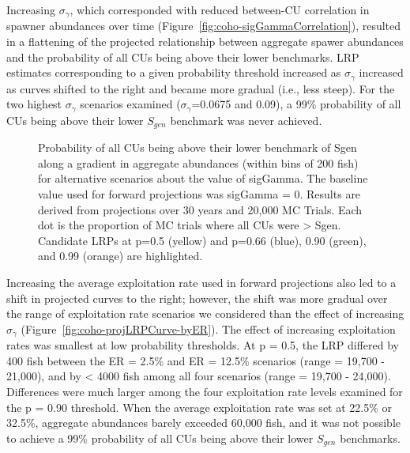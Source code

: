 \documentclass[11pt]{book}
\begin{document}
Increasing \(\sigma_{\gamma}\), which corresponded with reduced between-CU correlation in spawner abundances over time (Figure~\ref{fig:coho-sigGammaCorrelation}), resulted in a flattening of the projected relationship between aggregate spawer abundances and the probability of all CUs being above their lower benchmarks. LRP estimates corresponding to a given probability threshold increased as \(\sigma_{\gamma}\) increased as curves shifted to the right and became more gradual (i.e., less steep). For the two highest \(\sigma_{\gamma}\) scenarios examined (\(\sigma_{\gamma}\)=0.0675 and 0.09), a 99\% probability of all CUs being above their lower \(S_{gen}\) benchmark was never achieved.
\begin{figure}[htb]

{\centering {} 

}

\caption{Probability of all CUs being above their lower benchmark of Sgen along a gradient in aggregate abundances (within bins of 200 fish) for alternative scenarios about the value of sigGamma. The baseline value used for forward projections was sigGamma = 0. Results are derived from projections over 30 years and 20,000 MC Trials. Each dot is the proportion of MC trials where all CUs were > Sgen.  Candidate LRPs at p=0.5 (yellow) and p=0.66 (blue), 0.90 (green), and 0.99 (orange) are highlighted.}\label{fig:coho-projLRPCurve-bySigGamma}
\end{figure}
Increasing the average exploitation rate used in forward projections also led to a shift in projected curves to the right; however, the shift was more gradual over the range of exploitation rate scenarios we considered than the effect of increasing \(\sigma_{\gamma}\) (Figure~\ref{fig:coho-projLRPCurve-byER}). The effect of increasing exploitation rates was smallest at low probability thresholds. At p = 0.5, the LRP differed by 400 fish between the ER = 2.5\% and ER = 12.5\% scenarios (range = 19,700 - 21,000), and by \textless{} 4000 fish among all four scenarios (range = 19,700 - 24,000). Differences were much larger among the four exploitation rate levels examined for the p = 0.90 threshold. When the average exploitation rate was set at 22.5\% or 32.5\%, aggregate abundances barely exceeded 60,000 fish, and it was not possible to achieve a 99\% probability of all CUs being above their lower \(S_{gen}\) benchmarks.
\end{document}
